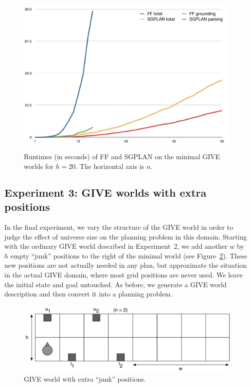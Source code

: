 \begin{figure}
  \centering
  \includegraphics[width=1\columnwidth]{pic-runtime-buttons}
  \caption{Runtimes (in seconds) of FF and SGPLAN on the minimal GIVE
    worlds for $h=20$. The horizontal axis is $n$.}
  \label{fig:give-runtime-minimal}
\end{figure}


\subsection{Experiment 3: GIVE worlds with extra positions}
\label{sec:experiment-3:-give}

In the final experiment, we vary the structure of the GIVE world in order
to judge the effect of universe size on the planning problem in this
domain.  Starting with the ordinary GIVE world described in Experiment~2,
we add another $w$ by $h$ empty ``junk'' positions to the right of the
minimal world (see Figure~\ref{fig:give-junk}). These new positions are not
actually needed in any plan, but approximate the situation in the actual
GIVE domain, where most grid positions are never used. We leave the initial
state and goal untouched. As before, we generate a GIVE world description
and then convert it into a planning problem.

\begin{figure}
  \centering
  \includegraphics[width=1\columnwidth]{pic-empty-buttons}
  \caption{GIVE world with extra ``junk'' positions.}
  \label{fig:give-junk}
\end{figure}

